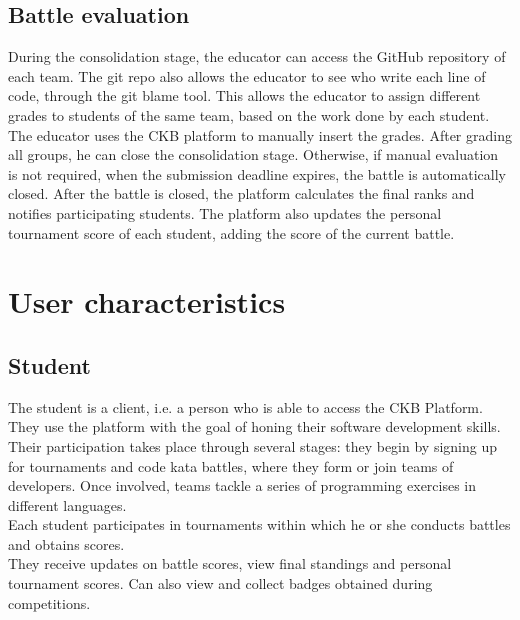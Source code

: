 \subsection{Battle evaluation}
During the consolidation stage, the educator can access the GitHub repository of each team.
The git repo also allows the educator to see who write each line of code, through the git blame tool.
This allows the educator to assign different grades to students of the same team, based on the work done by each student.
The educator uses the CKB platform to manually insert the grades.
After grading all groups, he can close the consolidation stage.
Otherwise, if manual evaluation is not required, when the submission deadline expires,
the battle is automatically closed.
After the battle is closed, the platform calculates the final ranks and notifies participating students.
The platform also updates the personal tournament score of each student, adding the score of the current battle.
\begin{adjustbox}{
		max size={\textwidth}{},
		center,
		caption={ Battle evaluation activity diagram},
		label={fig:Battle evaluation activity diagram},
		figure=H}
\end{adjustbox}


\section{User characteristics}
\subsection{Student}
The student is a client, i.e. a person who is able to access the CKB Platform.\\
They use the platform with the goal of honing their software development skills. Their participation takes place through several stages: they begin by signing up for tournaments and code kata battles, where they form or join teams of developers. Once involved, teams tackle a series of programming exercises in different languages. \\
Each student participates in tournaments within which he or she conducts battles and obtains scores.\\
They receive updates on battle scores, view final standings and personal tournament scores. Can also view and collect badges obtained during competitions.


